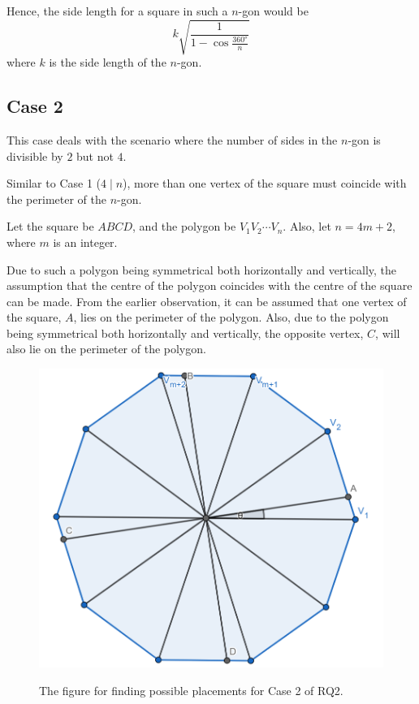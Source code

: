 \documentclass[12pt]{scrartcl}
\begin{document}
Hence, the side length for a square in such a $n$-gon would be
\begin{equation}
k\sqrt{\frac{1}{1 - \cos\frac{\ang{360}}{n}}}
\end{equation}
where $k$ is the side length of the $n$-gon.

\pagebreak

\subsection{Case 2}
This case deals with the scenario where the number of sides in the $n$-gon is divisible by $2$ but not $4$.

Similar to Case 1 ($4\mid n$), more than one vertex of the square must coincide with the perimeter of the $n$-gon.

Let the square be $ABCD$, and the polygon be $V_{1}V_{2} \cdots V_{n}$. Also, let \(n = 4m + 2\), where $m$ is an integer.

Due to such a polygon being symmetrical both horizontally and vertically, the assumption that the centre of the polygon coincides with the centre of the square can be made. From the earlier observation, it can be assumed that one vertex of the square, $A$, lies on the perimeter of the polygon. Also, due to the polygon being symmetrical both horizontally and vertically, the opposite vertex, $C$, will also lie on the perimeter of the polygon.

\begin{figure}[htpb]
	\centering
	\includegraphics[scale=.75]{images/rq2_2_1.jpg}
	\label{fig:rq2_2_1_img}
	\caption{The figure for finding possible placements for Case 2 of RQ2.}
\end{figure}
\end{document}

